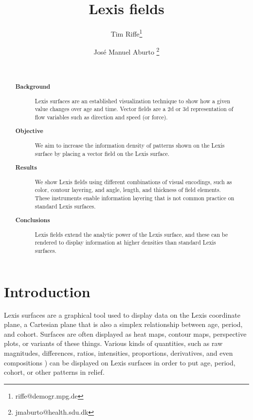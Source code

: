 \documentclass{article}
\begin{document}
\title{Lexis fields}

\author[1]{Tim Riffe\thanks{riffe@demogr.mpg.de}}
\author[2]{Jos\'e Manuel Aburto \thanks{jmaburto@health.sdu.dk}}

\maketitle

\begin{abstract}
~
\begin{description}
\item[\textbf{Background}] Lexis surfaces are an established visualization
technique to show how a given value changes over age and time. Vector fields are
a 2d or 3d representation of flow variables such as direction and speed (or
force). 
\item[\textbf{Objective}] We aim to increase the information density of patterns
shown on the Lexis surface by placing a vector field on the Lexis surface. 
\item[\textbf{Results}] We show Lexis fields using different combinations of
visual encodings, such as color, contour layering, and angle, length,
and thickness of field elements. These instruments enable information layering
that is not common practice on standard Lexis surfaces.
\item[\textbf{Conclusions}] Lexis fields extend the analytic power of the Lexis
surface, and these can be rendered to display information at higher densities
than standard Lexis surfaces.
\end{description}
\end{abstract}

\onehalfspacing
\section*{Introduction}
Lexis surfaces are a graphical tool used to display data on the Lexis coordinate plane, a Cartesian plane that is also a simplex relationship between age, period, and cohort. Surfaces are often displayed as heat maps, contour maps, perspective plots, or variants of these things. Various kinds of quantities, such as raw magnitudes, differences, ratios, intensities, proportions, derivatives, and even compositions \citep{scholey2017visualizing}) can be displayed on Lexis surfaces in order to put age, period, cohort, or other patterns in relief. 
\end{document}
